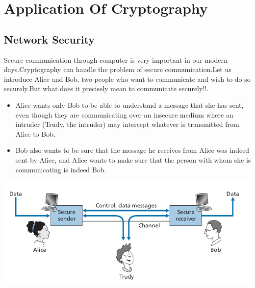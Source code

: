\documentclass{report}
\theoremstyle{definition}
\begin{document}
{{{}

\chapter{Application Of Cryptography }
\section{Network Security}
\Large{Secure communication through computer is very important in our modern days.Cryptography can handle the problem of secure communication.Let us introduce Alice and Bob, two people who want to communicate and wish
to do so securely.But what does it precisely mean to communicate securely!!.
\begin{itemize}
\item Alice wants only Bob to be able to understand a message that she has sent, even
though they are communicating over an insecure medium where an intruder (Trudy,
the intruder) may intercept whatever is transmitted from Alice to Bob.
\item Bob also
wants to be sure that the message he receives from Alice was indeed sent by Alice,
and Alice wants to make sure that the person with whom she is communicating is
indeed Bob.
\end{itemize}
\includegraphics[scale=0.5]{"seccom.png"}

}
}}
\end{document}
